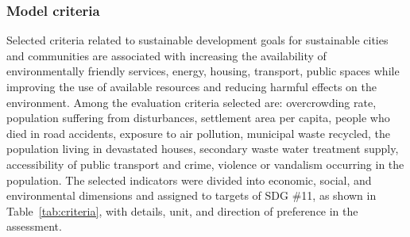 \documentclass[final,5p,times,twocolumn,authoryear]{elsarticle}
\begin{document}
\subsubsection{Model criteria}
\label{sec:ModelCriteria}
Selected criteria related to sustainable development goals for sustainable cities and communities are associated with increasing the availability of environmentally friendly services, energy, housing, transport, public spaces while improving the use of available resources and reducing harmful effects on the environment. Among the evaluation criteria selected are: overcrowding rate, population suffering from disturbances, settlement area per capita, people who died in road accidents, exposure to air pollution, municipal waste recycled, the population living in devastated houses, secondary waste water treatment supply, accessibility of public transport and crime, violence or vandalism occurring in the population. The selected indicators were divided into economic, social, and environmental dimensions and assigned to targets of SDG \#11, as shown in Table~\ref{tab:criteria}, with details, unit, and direction of preference in the assessment.
\end{document}
